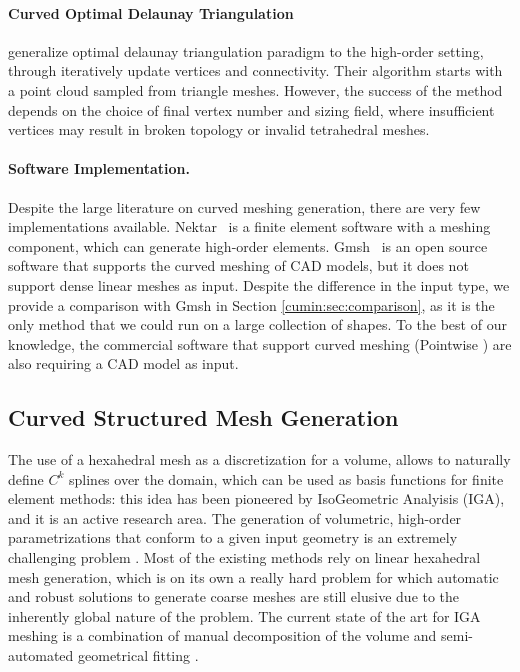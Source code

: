 \paragraph{Curved Optimal Delaunay Triangulation}
\cite{feng2018curved} generalize optimal delaunay triangulation paradigm to the high-order setting, through iteratively update vertices and connectivity.
Their algorithm starts with a point cloud sampled from triangle meshes. However, the success of the method depends on the choice of final vertex number and sizing field, where insufficient vertices may result in broken topology or invalid tetrahedral meshes.

\paragraph{Software Implementation.}
Despite the large literature on curve{d} meshing generation, there are very few implementations available. 
Nektar~\cite{moxeynekmesh} is a finite element software with a meshing component, which can generate high-order elements.
Gmsh~\cite{Geuzaine:2009:gmsh} is an open source software that supports the curved meshing of CAD models, but it does not support dense linear meshes as input. Despite the difference in the input type, we provide a comparison with Gmsh in Section \ref{cumin:sec:comparison}, as it is the only method that we could run on a large collection of shapes.
%
To the best of our knowledge, the commercial software that support curved meshing (Pointwise \cite{pointwise,Steve2016}) are also requiring a CAD model as input.



\subsection{Curved Structured Mesh Generation}

The use of a hexahedral mesh as a discretization for a volume, allows to naturally define $C^k$ splines over the domain, which can be used as basis functions for finite element methods: this idea has been pioneered by 
IsoGeometric Analyisis (IGA), and it is an active research area. The generation of volumetric, high-order parametrizations that conform to a given input geometry is an extremely challenging problem \cite{Sorger:2014,Peir2015OnCH}. Most of the existing methods rely on linear hexahedral mesh generation, which is on its own a really hard problem for which automatic and robust solutions to generate coarse meshes are still elusive \cite{Yufei:2012,Gao:2019,Guo2020Cut,Palmer:2020,Zhang:2020,marschner2020hexahedral} due to the inherently global nature of the problem. 
%
The current state of the art for IGA meshing is a combination of manual decomposition of the volume and semi-automated geometrical fitting \cite{yu2020hexgen,coreform}.

